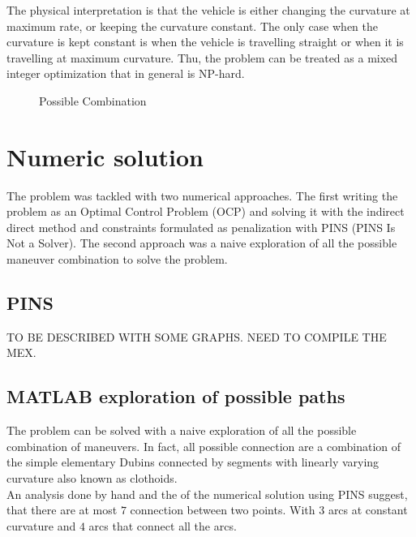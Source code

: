 \documentclass[11pt,twocolumn]{scrartcl}
\begin{document}
The physical interpretation is that the vehicle is either changing the curvature at maximum rate, or keeping the curvature constant.
The only case when the curvature is kept constant is when the vehicle is travelling straight or when it is travelling at maximum curvature.
Thu, the problem can be treated as a mixed integer optimization that in general is NP-hard.


\begin{figure}[ht]
  \centering
  \resizebox{\linewidth}{!}{%
  }%
  \caption{Possible Combination}
  \label{fig:possiblecombination}
\end{figure}


\section*{Numeric solution}

The problem was tackled with two numerical approaches. The first writing the problem as an Optimal Control Problem (OCP) and solving it with the indirect direct method and constraints formulated as penalization with PINS (PINS Is Not a Solver)\cite{biral2016notes}. The second approach was a naive exploration of all the possible maneuver combination to solve the problem.

\subsection*{PINS}

TO BE DESCRIBED WITH SOME GRAPHS. NEED TO COMPILE THE MEX.

\subsection*{MATLAB exploration of possible paths}

The problem can be solved with a naive exploration of all the possible combination of maneuvers. In fact, all possible connection are a combination of the simple elementary Dubins connected by segments with linearly varying curvature also known as clothoids.\cite{bertolazzi2015g1}\\
An analysis done by hand and the of the numerical solution using PINS suggest, that there are at most $7$ connection between two points. With $3$ arcs at constant curvature and $4$ arcs that connect all the arcs.\\





%

%



 
\end{document}

